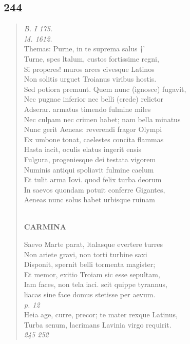 \documentclass[11pt, a4paper]{report}
\begin{document}
            \subsection*{244}
      \begin{verse}
      \textit{B. I 175.} \\ \textit{M. 1612.} \\ Themas: Purne, in te suprema salus †’ \\ Turne, spes ltalum, custos fortissime regni, \\ Si properes! muros arces civesque Latinos \\ Non solitis urguet Troianus viribus hostis. \\ Sed potiora premunt. Quem nunc (ignosce) fugavit, \\ Nec pugnae inferior nec belli (crede) relictor \\ Adserar. armatus timendo fulmine miles \\ Nec culpam nec crimen habet; nam bella minatus \\ Nunc gerit Aeneas: reverendi fragor Olympi \\ Ex umbone tonat, caelestes concita flammas \\ Hasta iacit, oculis elatus ingerit ensis \\ Fulgura, progeniesque dei testata vigorem \\ Numinis antiqui spoliavit fulmine caelum \\ Et tulit arma Iovi. quod felix turba deorum \\ In saevos quondam potuit conferre Gigantes, \\ Aeneas nunc solus habet urbisque ruinam \\ 
        ﻿\pagebreak 
    \begin{center} \textbf{CARMINA} \end{center} \marginpar{[200]} Saevo Marte parat, ltalasque evertere turres \\ Non ariete gravi, non torti turbine saxi \\ Disponit, spernit belli tormenta magister; \\ Et memor, exitio Troiam sic esse sepultam, \\ Iam faces, non tela iaci. scit quippe tyrannus, \\ liacas sine face domus stetisse per aevum. \\ \textit{p. 12} \\ Heia age, curre, precor; te mater rexque Latinus, \\ Turba senum, lacrimans Lavinia virgo requirit. \\ \textit{245 252} \\ 
      \end{verse}
  
\end{document}
